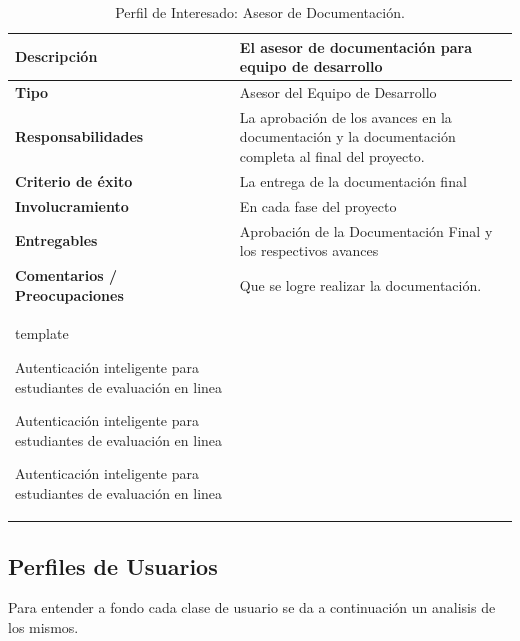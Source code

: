 \pagebreak

\begin{table}[h!]
  \begin{tabular}{|p{}|p{}|}
    \hline
    \textbf{Descripción} & El asesor de documentación para equipo de desarrollo \\
    \hline
    \textbf{Tipo} & Asesor del Equipo de Desarrollo \\
    \hline
    \textbf{Responsabilidades} & La aprobación de los avances en la documentación y la documentación completa al final del proyecto. \\
    \hline
    \textbf{Criterio de éxito} & La entrega de la documentación final \\
    \hline
    \textbf{Involucramiento} & En cada fase del proyecto \\
    \hline
    \textbf{Entregables} & Aprobación de la Documentación Final y los respectivos avances \\
    \hline
    \textbf{Comentarios / Preocupaciones} & Que se logre realizar la documentación. \\


















template

Autenticación inteligente para estudiantes de evaluación en linea


Autenticación inteligente para estudiantes de evaluación en linea


Autenticación inteligente para estudiantes de evaluación en linea
    \hline
  \end{tabular}
  \caption{Perfil de Interesado: Asesor de Documentación.}
  \label{per-inter-a-doc}
\end{table}

\vfill

\subsection{Perfiles de Usuarios}
Para entender a fondo cada clase de usuario se da a continuación un analisis de los mismos.


